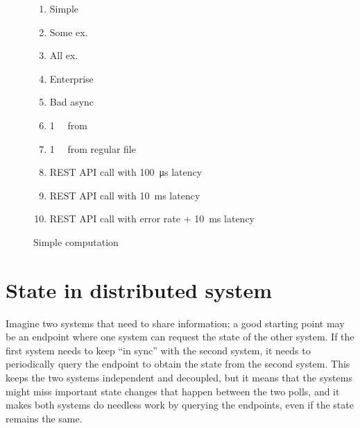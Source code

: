 \documentclass[10 pt, twocolumn]{article}
\begin{document}
\begin{figure*}[h]
  \begin{enumerate}[i]
    \item Simple
    \item Some ex.
    \item All ex.
    \item Enterprise
    \item Bad async
    \item \SI{1}{\mebi\byte} from 
    \item \SI{1}{\mebi\byte} from regular file
    \item REST API call with \SI{100}{\micro\second} latency
    \item REST API call with \SI{10}{\milli\second} latency
    \item REST API call with  error rate + \SI{10}{\milli\second} latency
  \end{enumerate}
  \caption{Simple computation}
  \label{plot:simple-computation}
\end{figure*}

\section{State in distributed system}
Imagine two systems that need to share information; a good starting point may be an endpoint where one system can request the state of the other system. If the first system needs to keep ``in sync'' with the second system, it needs to periodically query the endpoint to obtain the state from the second system. This keeps the two systems independent and decoupled, but it means that the systems might miss important state changes that happen between the two polls, and it makes both systems do needless work by querying the endpoints, even if the state remains the same.
\end{document}
